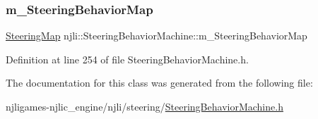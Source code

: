 \subsubsection{\texorpdfstring{m\+\_\+\+Steering\+Behavior\+Map}{m\_SteeringBehaviorMap}}
{\footnotesize\ttfamily \mbox{\hyperlink{classnjli_1_1_steering_behavior_machine_a4140175f3174e6e8d22e977a72220b5d}{Steering\+Map}} njli\+::\+Steering\+Behavior\+Machine\+::m\+\_\+\+Steering\+Behavior\+Map\hspace{0.3cm}{\ttfamily [protected]}}



Definition at line 254 of file Steering\+Behavior\+Machine.\+h.



The documentation for this class was generated from the following file\+:\begin{DoxyCompactItemize}
\item 
njligames-\/njlic\+\_\+engine/njli/steering/\mbox{\hyperlink{_steering_behavior_machine_8h}{Steering\+Behavior\+Machine.\+h}}\end{DoxyCompactItemize}
